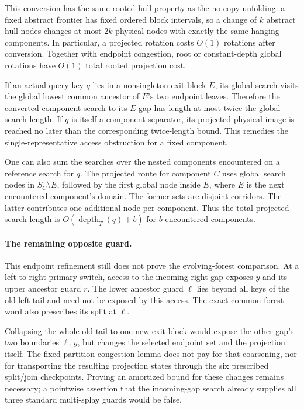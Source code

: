 \documentclass[11pt]{article}
\begin{document}
This conversion has the same rooted-hull property as the no-copy
unfolding: a fixed abstract frontier has fixed ordered block intervals,
so a change of $k$ abstract hull nodes changes at most $2k$ physical
nodes with exactly the same hanging components. In particular, a
projected rotation costs $O(1)$ rotations after conversion. Together
with endpoint congestion, root or constant-depth global rotations have
$O(1)$ total rooted projection cost.

If an actual query key $q$ lies in a nonsingleton exit block $E$, its
global search visits the global lowest common ancestor of $E$'s two
endpoint leaves. Therefore the converted component search to its
$E$-gap has length at most twice the global search length. If $q$ is
itself a component separator, its projected physical image is reached
no later than the corresponding twice-length bound. This remedies the
single-representative access obstruction for a fixed component.

One can also sum the searches over the nested components encountered
on a reference search for $q$. The projected route for component $C$
uses global search nodes in $S_C\setminus E$, followed by the first
global node inside $E$, where $E$ is the next encountered component's
domain. The former sets are disjoint corridors. The latter contributes
one additional node per component. Thus the total projected search
length is $O(\operatorname{depth}_T(q)+b)$ for $b$ encountered components.

\paragraph{The remaining opposite guard.}
This endpoint refinement still does not prove the evolving-forest
comparison. At a left-to-right primary switch, access to the incoming
right gap exposes $y$ and its upper ancestor guard $r$. The lower
ancestor guard $\ell$ lies beyond all keys of the old left tail and
need not be exposed by this access. The exact common forest word
also prescribes its split at $\ell$.

Collapsing the whole old tail to one new exit block would expose the
other gap's two boundaries $\ell,y$, but changes the selected endpoint
set and the projection itself. The fixed-partition congestion lemma
does not pay for that coarsening, nor for transporting the resulting
projection states through the six prescribed split/join checkpoints.
Proving an amortized bound for these changes remains necessary; a
pointwise assertion that the incoming-gap search already supplies all
three standard multi-splay guards would be false.
\end{document}

